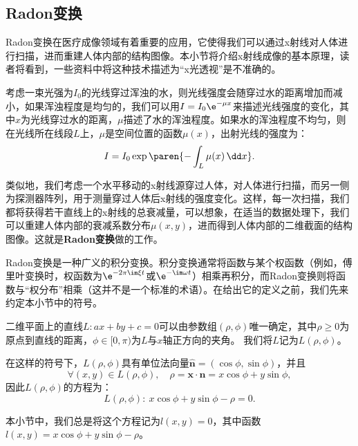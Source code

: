 \subsection{Radon变换}\label{sub:radon}

Radon变换在医疗成像领域有着重要的应用，它使得我们可以通过x射线对人体进行扫描，进而重建人体内部的结构图像。本小节将介绍x射线成像的基本原理，读者将看到，一些资料中将这种技术描述为“x光透视”是不准确的。

考虑一束光强为$I_0$的光线穿过浑浊的水，则光线强度会随穿过水的距离增加而减小，如果浑浊程度是均匀的，我们可以用$I=I_0 \e^{-\mu x}$来描述光线强度的变化，其中$x$为光线穿过水的距离，$\mu$描述了水的浑浊程度。如果水的浑浊程度不均匀，则在光线所在线段$L$上，$\mu$是空间位置的函数$\mu(x)$，出射光线的强度为：
\begin{equation}
    I=I_0 \exp\paren{-\int_{L}\mu(x)\,\dd x}.
\end{equation}

类似地，我们考虑一个水平移动的x射线源穿过人体，对人体进行扫描，而另一侧为探测器阵列，用于测量穿过人体后x射线的强度变化。这样，每一次扫描，我们都将获得若干直线上的x射线的总衰减量，可以想象，在适当的数据处理下，我们可以重建人体内部的衰减系数分布$\mu(x,y)$，进而得到人体内部的二维截面的结构图像。这就是\textbf{Radon变换}做的工作。

Radon变换是一种广义的积分变换。积分变换通常将函数与某个权函数（例如，傅里叶变换时，权函数为$\e^{-2\pi\im\xi t}$或$\e^{-\im\omega t}$）相乘再积分，而Radon变换则将函数与“权分布”相乘（这并不是一个标准的术语）。在给出它的定义之前，我们先来约定本小节中的符号。

\begin{definition}[二维平面上的直线系]
    二维平面上的直线$L:ax+by+c=0$可以由参数组$(\rho,\phi)$唯一确定，其中$\rho\geq 0$为原点到直线的距离，$\phi\in[0,\pi)$为$L$与$x$轴正方向的夹角。
    我们将$L$记为$L(\rho,\phi)$。
\end{definition}

在这样的符号下，$L(\rho,\phi)$具有单位法向量$\hat{\mathbf{n}}=(\cos\phi,\sin\phi)$，并且
\begin{equation}
    \forall (x,y)\in L(\rho,\phi),\quad \rho=\mathbf{x}\cdot\hat{\mathbf{n}}=x\cos\phi+y\sin\phi,
\end{equation}
因此$L(\rho,\phi)$的方程为：
\begin{equation}
    L(\rho,\phi):\ x\cos\phi+y\sin\phi-\rho=0.
\end{equation}

本小节中，我们总是将这个方程记为$l(x,y)=0$，其中函数$l(x,y)=x\cos\phi+y\sin\phi-\rho$。

